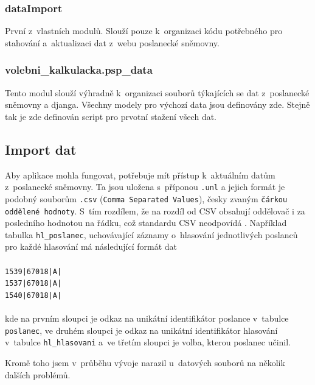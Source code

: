 \subsubsection{dataImport}
První z~vlastních modulů. Slouží pouze k~organizaci kódu potřebného pro stahování a~aktualizaci dat z~webu poslanecké sněmovny. 

\subsubsection{volebni\_kalkulacka.psp\_data}
Tento modul slouží výhradně k~organizaci souborů týkajících se dat z~poslanecké sněmovny a djanga. Všechny modely pro výchozí data jsou definovány zde. Stejně tak je zde definován script pro prvotní stažení všech dat.


\subsection{Import dat}
\label{import_dat}
Aby aplikace mohla fungovat, potřebuje mít přístup k~aktuálním datům z~poslanecké sněmovny. Ta jsou uložena s~příponou \texttt{.unl} a jejich formát je podobný souborům \texttt{.csv} (\texttt{Comma Separated Values}), česky zvaným \texttt{čárkou oddělené hodnoty}. S~tím rozdílem, že na rozdíl od CSV obsahují oddělovač i za posledního hodnotou na řádku, což standardu CSV neodpovídá \cite{RFC4180}. Například tabulka \texttt{hl\_poslanec}, uchovávající záznamy o~hlasování jednotlivých poslanců pro každé hlasování má následující formát dat\\
\\
\texttt{1539|67018|A|\\
1537|67018|A|\\
1540|67018|A|}\\
\\
kde na prvním sloupci je odkaz na unikátní identifikátor poslance v~tabulce \texttt{poslanec}, ve druhém sloupci je odkaz na unikátní identifikátor hlasování v~tabulce \texttt{hl\_hlasovani} a~ve třetím sloupci je volba, kterou poslanec učinil. 

\par Kromě toho jsem v~průběhu vývoje narazil u~datových souborů na několik dalších problémů.


